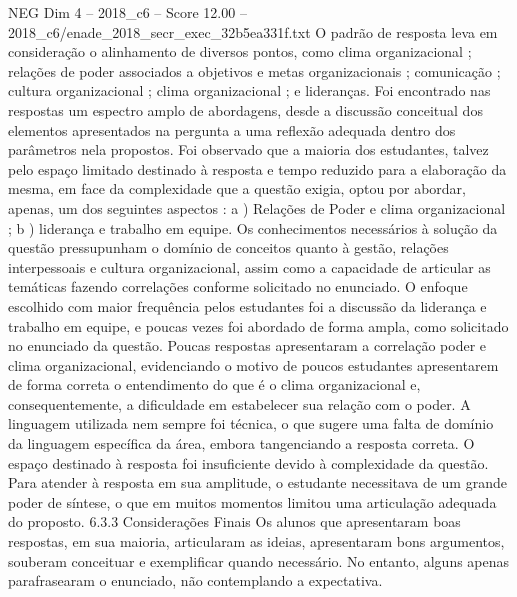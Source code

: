 \begin{textsample}{NEG Dim 4 – 2018\_c6 – Score 12.00 – 2018\_c6/enade\_2018\_secr\_exec\_32b5ea331f.txt}
O padrão de resposta leva em consideração o alinhamento de diversos pontos, como clima organizacional ; relações de poder associados a objetivos e metas organizacionais ; comunicação ; cultura organizacional ; clima organizacional ; e lideranças.
Foi encontrado nas respostas um espectro amplo de abordagens, desde a discussão conceitual dos elementos apresentados na pergunta a uma reflexão adequada dentro dos parâmetros nela propostos.
Foi observado que a maioria dos estudantes, talvez pelo espaço limitado destinado à resposta e tempo reduzido para a elaboração da mesma, em face da complexidade que a questão exigia, optou por abordar, apenas, um dos seguintes aspectos : a ) Relações de Poder e clima organizacional ; b ) liderança e trabalho em equipe.
Os conhecimentos necessários à solução da questão pressupunham o domínio de conceitos quanto à gestão, relações interpessoais e cultura organizacional, assim como a capacidade de articular as temáticas fazendo correlações conforme solicitado no enunciado.
O enfoque escolhido com maior frequência pelos estudantes foi a discussão da liderança e trabalho em equipe, e poucas vezes foi abordado de forma ampla, como solicitado no enunciado da questão.
Poucas respostas apresentaram a correlação poder e clima organizacional, evidenciando o motivo de poucos estudantes apresentarem de forma correta o entendimento do que é o clima organizacional e, consequentemente, a dificuldade em estabelecer sua relação com o poder.
A linguagem utilizada nem sempre foi técnica, o que sugere uma falta de domínio da linguagem específica da área, embora tangenciando a resposta correta.
O espaço destinado à resposta foi insuficiente devido à complexidade da questão.
Para atender à resposta em sua amplitude, o estudante necessitava de um grande poder de síntese, o que em muitos momentos limitou uma articulação adequada do proposto. 6.3.3 Considerações Finais Os alunos que apresentaram boas respostas, em sua maioria, articularam as ideias, apresentaram bons argumentos, souberam conceituar e exemplificar quando necessário.
No entanto, alguns apenas parafrasearam o enunciado, não contemplando a expectativa.

\end{textsample}
